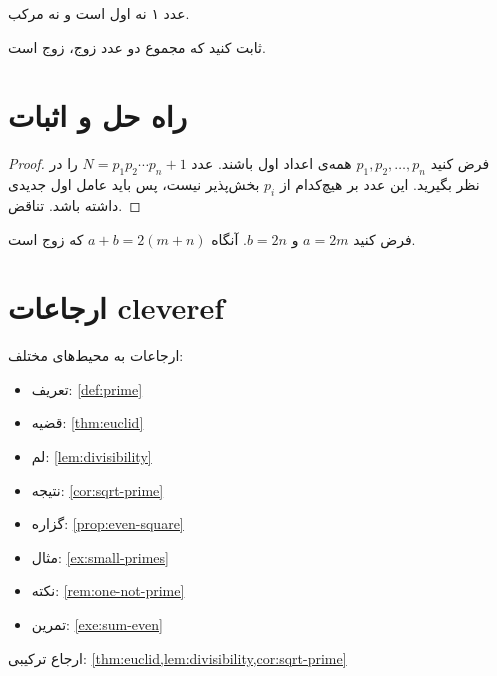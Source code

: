 \documentclass{matinbook}
\begin{document}
\begin{remark}[نکته]
    عدد ۱ نه اول است و نه مرکب.
    \label{rem:one-not-prime}
\end{remark}

\begin{exercise}
    ثابت کنید که مجموع دو عدد زوج، زوج است.
    \label{exe:sum-even}
\end{exercise}

\section{راه حل و اثبات}
\label{sec:solution-proof}

\begin{proof}
    فرض کنید $p_1, p_2, \ldots, p_n$ همه‌ی اعداد اول باشند.
    عدد $N = p_1 p_2 \cdots p_n + 1$ را در نظر بگیرید.
    این عدد بر هیچ‌کدام از $p_i$ بخش‌پذیر نیست، پس باید
    عامل اول جدیدی داشته باشد. تناقض.
\end{proof}

\begin{solution}
    فرض کنید $a = 2m$ و $b = 2n$. آنگاه
    $a + b = 2(m + n)$ که زوج است.
\end{solution}

\section{ارجاعات cleveref}
\label{sec:references}

ارجاعات به محیط‌های مختلف:

\begin{itemize}
    \item تعریف: \cref{def:prime}
    \item قضیه: \cref{thm:euclid}
    \item لم: \cref{lem:divisibility}
    \item نتیجه: \cref{cor:sqrt-prime}
    \item گزاره: \cref{prop:even-square}
    \item مثال: \cref{ex:small-primes}
    \item نکته: \cref{rem:one-not-prime}
    \item تمرین: \cref{exe:sum-even}
\end{itemize}

ارجاع ترکیبی: \cref{thm:euclid,lem:divisibility,cor:sqrt-prime}

\end{document}

